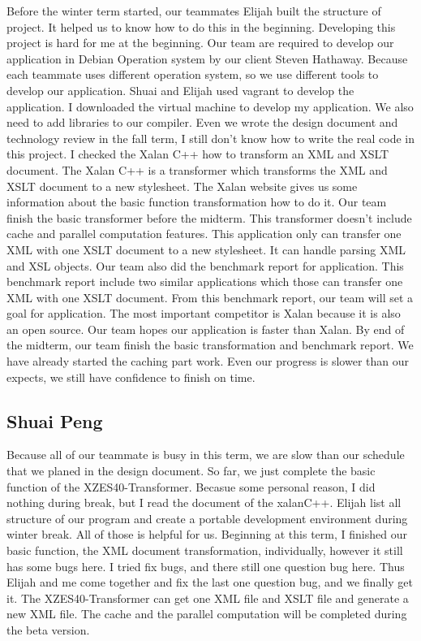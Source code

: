 Before the winter term started, our teammates Elijah built the structure of project. 
It helped us to know how to do this in the beginning. 
Developing this project is hard for me at the beginning.
Our team are required to develop our application in Debian Operation system by our client Steven Hathaway.
Because each teammate uses different operation system, so we use different tools to develop our application.
Shuai and Elijah used vagrant to develop the application.
I downloaded the virtual machine to develop my application.
We also need to add libraries to our compiler.  
Even we wrote the design document and technology review in the fall term, I still don't know how to write the real code in this project. 
I checked the Xalan C++ how to transform an XML and XSLT document.
The Xalan C++ is a transformer which transforms the XML and XSLT document to a new stylesheet.
The Xalan website gives us some information about the basic function transformation how to do it. 
Our team finish the basic transformer before the midterm.
This transformer doesn’t include cache and parallel computation features. 
This application only can transfer one XML with one XSLT document to a new stylesheet.
It can handle parsing XML and XSL objects. Our team also did the benchmark report for application. 
This benchmark report include two similar applications which those can transfer one XML with one XSLT document.
From this benchmark report, our team will set a goal for application.
The most important competitor is Xalan because it is also an open source. Our team hopes our application is faster than Xalan.
By end of the midterm, our team finish the basic transformation and benchmark report.
We have already started the caching part work. 
Even our progress is slower than our expects, we still have confidence to finish on time. 

\subsection{Shuai Peng}

Because all of our teammate is busy in this term, we are slow than our schedule that we planed in the design document. 
So far, we just complete the basic function of the XZES40-Transformer.
Becasue some personal reason, I did nothing during break, but I read the document of the xalanC++.
Elijah list all structure of our program and create a portable development environment during winter break. 
All of those is helpful for us.
Beginning at this term, I finished our basic function, the XML document transformation, individually, however it still has some bugs here.
I tried fix bugs, and there still one question bug here.
Thus Elijah and me come together and fix the last one question bug, and we finally get it.
The XZES40-Transformer can get one XML file and XSLT file and generate a new XML file.
The cache and the parallel computation will be completed during the beta version.

